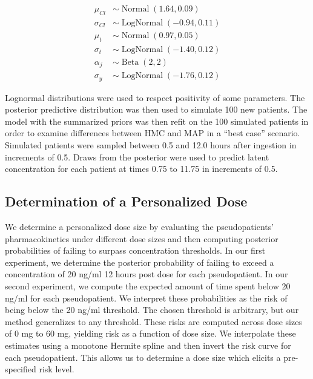 \begin{align}
	\mu_{Cl} &\sim \operatorname{Normal}(1.64, 0.09)  \label{eq:eq_18} \\
	\sigma_{Cl} &\sim \operatorname{LogNormal}(-0.94, 0.11)  \label{eq:eq_19} \\
	\mu_{t} &\sim \operatorname{Normal}(0.97, 0.05)   \label{eq:eq_20} \\
	\sigma_{t} &\sim \operatorname{LogNormal}(-1.40, 0.12)  \label{eq:eq_21} \\
	\alpha_j &\sim \operatorname{Beta}(2,2)  \label{eq:eq_22} \\
	\sigma_y &\sim \operatorname{LogNormal}(-1.76, 0.12)  \label{eq:eq_23}
\end{align}

\noindent Lognormal distributions were used to respect positivity of some parameters.   The posterior predictive distribution was then used to simulate 100 new patients.  The model with the summarized priors was then refit on the 100 simulated patients in order to examine differences between HMC and MAP in a “best case” scenario. Simulated patients were sampled between 0.5 and 12.0 hours after ingestion in increments of 0.5. Draws from the posterior were used to predict latent concentration for each patient at times 0.75 to 11.75 in increments of 0.5.

\subsection*{Determination of a Personalized Dose}

We determine a personalized dose size by evaluating the pseudopatients’ pharmacokinetics under different dose sizes and then computing posterior probabilities of failing to surpass concentration thresholds.  In our first experiment, we determine the posterior probability of failing to exceed a concentration of 20 ng/ml 12 hours post dose for each pseudopatient.  In our second experiment, we compute the expected amount of time spent below 20 ng/ml for each pseudopatient.  We interpret these probabilities as the risk of being below the 20 ng/ml threshold.  The chosen threshold is arbitrary, but our method generalizes to any threshold.  These risks are computed across dose sizes of 0 mg to 60 mg, yielding risk as a function of dose size.  We interpolate these estimates using a monotone Hermite spline and then invert the risk curve for each pseudopatient.  This allows us to determine a dose size which elicits a pre-specified risk level.
